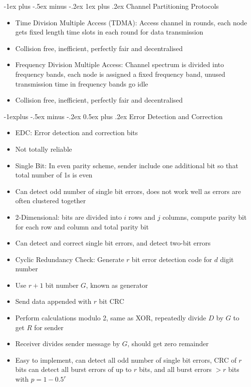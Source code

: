 \documentclass[10pt, landscape]{article}
\makeatletter
\renewcommand{\section}{\@startsection{section}{1}{0mm}%
                                {-1ex plus -.5ex minus -.2ex}%
                                {0.5ex plus .2ex}%
                                {\normalfont\large\bfseries}}
\renewcommand{\section}{\@startsection{section}{2}{0mm}%
                                {-1explus -.5ex minus -.2ex}%
                                {0.5ex plus .2ex}%
                                {\normalfont\normalsize\bfseries}}
\renewcommand{\subsection}{\@startsection{subsection}{3}{0mm}%
                                {-1ex plus -.5ex minus -.2ex}%
                                {1ex plus .2ex}%
                                {\normalfont\small\bfseries}}%
\makeatother
\begin{document}
\begin{multicols*}{3}
\subsection{Channel Partitioning Protocols}
\begin{itemize}
    \item Time Division Multiple Access (TDMA): Access channel in rounds, each node gets fixed length time slots in each round for data transmission
    \item Collision free, inefficient, perfectly fair and decentralised
    \item Frequency Division Multiple Access: Channel spectrum is divided into frequency bands, each node is assigned a fixed frequency band, unused transmission time in frequency bands go idle
    \item Collision free, inefficient, perfectly fair and decentralised
\end{itemize}

\section{Error Detection and Correction}
\begin{itemize}
    \item EDC: Error detection and correction bits
    \item Not totally reliable
    \item Single Bit: In even parity scheme, sender include one additional bit so that total number of 1s is even
    \item Can detect odd number of single bit errors, does not work well as errors are often clustered together
    \item 2-Dimensional: bits are divided into $i$ rows and $j$ columns, compute parity bit for each row and column and total parity bit
    \item Can detect and correct single bit errors, and detect two-bit errors
    \item Cyclic Redundancy Check: Generate $r$ bit error detection code for $d$ digit number
    \item Use $r+1$ bit number $G$, known as generator
    \item Send data appended with $r$ bit CRC
    \item Perform calculations modulo 2, same as XOR, repeatedly divide $D$ by $G$ to get $R$ for sender
    \item Receiver divides sender message by $G$, should get zero remainder
    \item Easy to implement, can detect all odd number of single bit errors, CRC of $r$ bits can detect all burst errors of up to $r$ bits, and all burst errors $>r$ bits with $p=1-0.5^r$
\end{itemize}


\end{multicols*}
\end{document}
